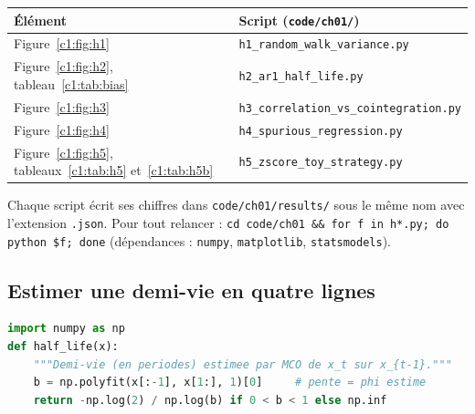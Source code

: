\begin{center}\small
\begin{tabular}{ll}
\toprule
Élément & Script (\texttt{code/ch01/}) \\
\midrule
Figure~\ref{c1:fig:h1} & \texttt{h1\_random\_walk\_variance.py} \\
Figure~\ref{c1:fig:h2}, tableau~\ref{c1:tab:bias} & \texttt{h2\_ar1\_half\_life.py} \\
Figure~\ref{c1:fig:h3} & \texttt{h3\_correlation\_vs\_cointegration.py} \\
Figure~\ref{c1:fig:h4} & \texttt{h4\_spurious\_regression.py} \\
Figure~\ref{c1:fig:h5}, tableaux~\ref{c1:tab:h5} et~\ref{c1:tab:h5b} & \texttt{h5\_zscore\_toy\_strategy.py} \\
\bottomrule
\end{tabular}
\end{center}

\noindent Chaque script écrit ses chiffres dans \texttt{code/ch01/results/} sous le même nom avec l'extension \texttt{.json}. Pour tout relancer : \texttt{cd code/ch01 \&\& for f in h*.py; do python \$f; done} (dépendances : \texttt{numpy}, \texttt{matplotlib}, \texttt{statsmodels}).

\subsection*{Estimer une demi-vie en quatre lignes}

\begin{lstlisting}[language=Python]
import numpy as np
def half_life(x):
    """Demi-vie (en periodes) estimee par MCO de x_t sur x_{t-1}."""
    b = np.polyfit(x[:-1], x[1:], 1)[0]     # pente = phi estime
    return -np.log(2) / np.log(b) if 0 < b < 1 else np.inf
\end{lstlisting}

